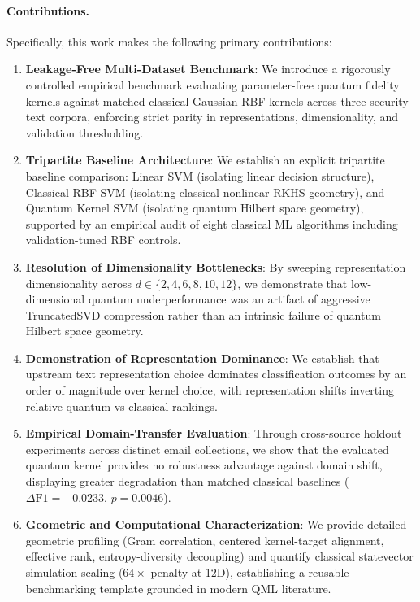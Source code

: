\documentclass[10pt,twocolumn,letterpaper]{article}
\begin{document}
\paragraph{Contributions.} Specifically, this work makes the following primary contributions:
\begin{enumerate}
    \item \textbf{Leakage-Free Multi-Dataset Benchmark}: We introduce a rigorously controlled empirical benchmark evaluating parameter-free quantum fidelity kernels against matched classical Gaussian RBF kernels across three security text corpora, enforcing strict parity in representations, dimensionality, and validation thresholding.
    \item \textbf{Tripartite Baseline Architecture}: We establish an explicit tripartite baseline comparison: Linear SVM (isolating linear decision structure), Classical RBF SVM (isolating classical nonlinear RKHS geometry), and Quantum Kernel SVM (isolating quantum Hilbert space geometry), supported by an empirical audit of eight classical ML algorithms including validation-tuned RBF controls.
    \item \textbf{Resolution of Dimensionality Bottlenecks}: By sweeping representation dimensionality across $d \in \{2, 4, 6, 8, 10, 12\}$, we demonstrate that low-dimensional quantum underperformance was an artifact of aggressive TruncatedSVD compression rather than an intrinsic failure of quantum Hilbert space geometry.
    \item \textbf{Demonstration of Representation Dominance}: We establish that upstream text representation choice dominates classification outcomes by an order of magnitude over kernel choice, with representation shifts inverting relative quantum-vs-classical rankings.
    \item \textbf{Empirical Domain-Transfer Evaluation}: Through cross-source holdout experiments across distinct email collections, we show that the evaluated quantum kernel provides no robustness advantage against domain shift, displaying greater degradation than matched classical baselines ($\Delta\text{F1} = -0.0233$, $p = 0.0046$).
    \item \textbf{Geometric and Computational Characterization}: We provide detailed geometric profiling (Gram correlation, centered kernel-target alignment, effective rank, entropy-diversity decoupling) and quantify classical statevector simulation scaling ($64\times$ penalty at 12D), establishing a reusable benchmarking template grounded in modern QML literature.
\end{enumerate}
\end{document}
